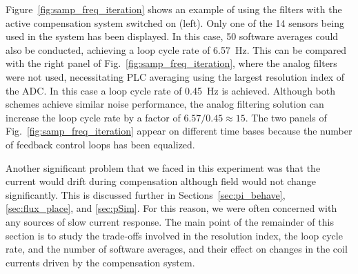 Figure~\ref{fig:samp_freq_iteration} shows an example of using the
filters with the active compensation system switched on (left).  Only
one of the 14 sensors being used in the system has been displayed.  In
this case, 50 software averages could also be conducted, achieving a
loop cycle rate of 6.57~Hz.  This can be compared with the right panel
of Fig.~\ref{fig:samp_freq_iteration}, where the analog filters were
not used, necessitating PLC averaging using the largest resolution
index of the ADC.  In this case a loop cycle rate of 0.45~Hz is
achieved.  Although both schemes achieve similar noise performance,
the analog filtering solution can increase the loop cycle rate by a
factor of $6.57/0.45\approx 15$.  The two panels of
Fig.~\ref{fig:samp_freq_iteration} appear on different time bases
because the number of feedback control loops has been equalized.



Another significant problem that we faced in this experiment was that
the current would drift during compensation although field would not
change significantly.  This is discussed further in Sections~\ref{sec:pi_behave}, \ref{sec:flux_place}, and \ref{sec:pSim}.  For this reason, we were
often concerned with any sources of slow current response.  The main
point of the remainder of this section is to study the trade-offs
involved in the resolution index, the loop cycle rate, and the number
of software averages, and their effect on changes in the coil currents
driven by the compensation system.


